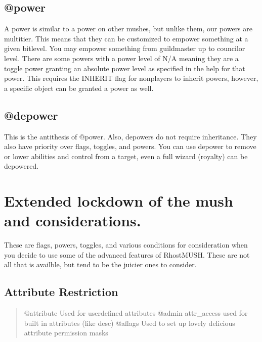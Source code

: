 \documentclass[letterpaper,10pt,english]{sphinxmanual}
\begin{document}
\section{@power}
\label{\detokenize{07-toggles:power}}
\sphinxAtStartPar
A power is similar to a power on other mushes, but unlike them, our
powers are multi\sphinxhyphen{}tier.  This means that they can be customized to
empower something at a given bitlevel.  You may empower something
from guildmaster up to councilor level.  There are some powers
with a power level of N/A meaning they are a toggle power granting
an absolute power level as specified in the help for that power.
This requires the INHERIT flag for non\sphinxhyphen{}players to inherit powers,
however, a specific object can be granted a power as well.


\section{@depower}
\label{\detokenize{07-toggles:depower}}
\sphinxAtStartPar
This is the anti\sphinxhyphen{}thesis of @power.  Also, depowers do not require
inheritance.  They also have priority over flags, toggles, and
powers.  You can use depower to remove or lower abilities and
control from a target, even a full wizard (royalty) can be
depowered.


\chapter{Extended lockdown of the mush and considerations.}
\label{\detokenize{08-lockdown:extended-lockdown-of-the-mush-and-considerations}}\label{\detokenize{08-lockdown::doc}}
\sphinxAtStartPar
These are flags, powers, toggles, and various conditions for consideration
when you decide to use some of the advanced features of RhostMUSH.
These are not all that is availble, but tend to be the juicier ones to consider.


\section{Attribute Restriction}
\label{\detokenize{08-lockdown:attribute-restriction}}\begin{quote}

\sphinxAtStartPar
@attribute \textendash{} Used for user\sphinxhyphen{}defined attributes
@admin attr\_access \textendash{} used for built in attributes (like desc)
@aflags \textendash{} Used to set up lovely delicious attribute permission masks
\end{quote}
\end{document}
